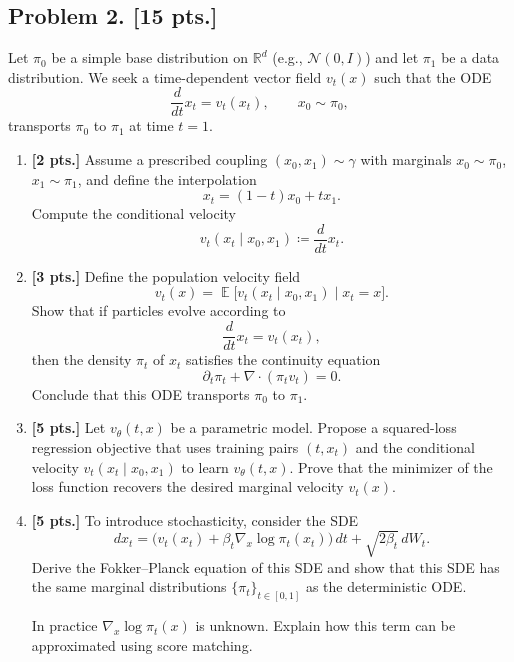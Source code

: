 \documentclass[11pt,a4paper]{article}
\DeclareMathOperator{\E}{\mathbb{E}}
\begin{document}
\subsection{Problem 2. [15 pts.]}
Let $\pi_0$ be a simple base distribution on $\mathbb{R}^{d}$ (e.g., $\mathcal{N}(0, I)$) and let $\pi_1$ be a data distribution. We seek a time-dependent vector field $v_t(x)$ such that the ODE
\[
\frac{d}{dt} x_t = v_t(x_t), \qquad x_0 \sim \pi_0,
\]
transports $\pi_0$ to $\pi_1$ at time $t = 1$.
\begin{enumerate}[label=(\alph*)]
    \item \textbf{[2 pts.]} Assume a prescribed coupling $(x_0, x_1) \sim \gamma$ with marginals $x_0 \sim \pi_0$, $x_1 \sim \pi_1$, and define the interpolation
    \[
    x_t = (1 - t)x_0 + t x_1.
    \]
    Compute the conditional velocity
    \[
    v_t(x_t \mid x_0, x_1) \coloneqq \frac{d}{dt} x_t.
    \]
    \item \textbf{[3 pts.]} Define the population velocity field
    \[
    v_t(x) = \E\bigl[v_t(x_t \mid x_0, x_1) \mid x_t = x\bigr].
    \]
    Show that if particles evolve according to
    \[
    \frac{d}{dt} x_t = v_t(x_t),
    \]
    then the density $\pi_t$ of $x_t$ satisfies the continuity equation
    \[
    \partial_t \pi_t + \nabla \cdot (\pi_t v_t) = 0.
    \]
    Conclude that this ODE transports $\pi_0$ to $\pi_1$.
    \item \textbf{[5 pts.]} Let $v_{\theta}(t, x)$ be a parametric model. Propose a squared-loss regression objective that uses training pairs $(t, x_t)$ and the conditional velocity $v_t(x_t \mid x_0, x_1)$ to learn $v_{\theta}(t, x)$. Prove that the minimizer of the loss function recovers the desired marginal velocity $v_t(x)$.
    \item \textbf{[5 pts.]} To introduce stochasticity, consider the SDE
    \[
    d x_t = \bigl( v_t(x_t) + \beta_t \nabla_x \log \pi_t(x_t) \bigr)\, dt + \sqrt{2\beta_t}\, dW_t.
    \]
    Derive the Fokker--Planck equation of this SDE and show that this SDE has the same marginal distributions $\{\pi_t\}_{t \in [0,1]}$ as the deterministic ODE.

    In practice $\nabla_x \log \pi_t(x)$ is unknown. Explain how this term can be approximated using score matching.
\end{enumerate}
\end{document}
